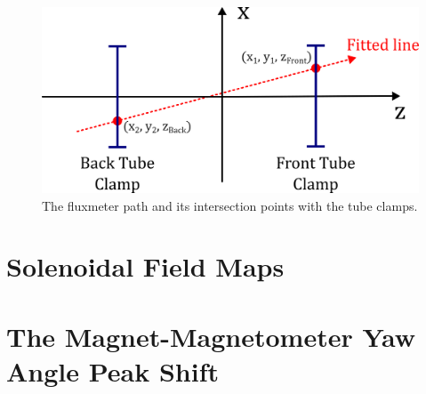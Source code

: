 \begin{figure}[!h]
    \centering
    \includegraphics[width=0.8\linewidth]{figs/alignment}
    \caption{The fluxmeter path and its intersection points with
    the tube clamps.}
    \label{fig:alignment}
\end{figure}


\section{Solenoidal Field Maps}
\section{The Magnet-Magnetometer Yaw Angle Peak Shift}
